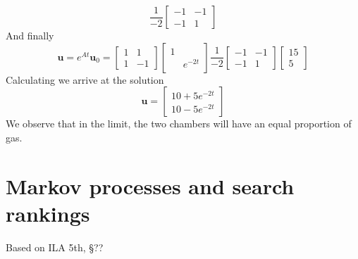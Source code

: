 \documentclass[11pt,oneside]{amsbook}
\theoremstyle{definition}
\theoremstyle{plain}
\theoremstyle{definition}
\theoremstyle{remark}
\numberwithin{equation}{section}
\numberwithin{figure}{section}
\begin{document}
\begin{itemize}
\[    \frac{1}{-2}
    \begin{bmatrix}-1&-1\\-1&1\end{bmatrix}
  \]
  And finally
  \[\mathbf{u}=e^{At}\mathbf{u}_0
    =\begin{bmatrix}1&1\\1&-1\end{bmatrix}
    \begin{bmatrix}1\\&e^{-2t}\end{bmatrix}
    \frac{1}{-2}
    \begin{bmatrix}-1&-1\\-1&1\end{bmatrix}
    \begin{bmatrix}15\\5\end{bmatrix}
  \]
  Calculating we arrive at the solution
  \[\mathbf{u}
    =\begin{bmatrix}10+5e^{-2t}\\10-5e^{-2t}\end{bmatrix}
  \]
  We observe that in the limit, the two chambers will have an equal proportion of gas.
\end{itemize}

\newpage
\section{Markov processes and search rankings}

Based on ILA 5th, \S ??
\end{document}
